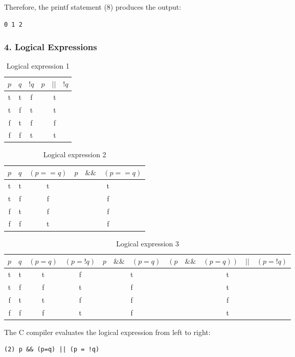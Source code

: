 \documentclass[12pt]{article}
\begin{document}
Therefore, the printf statement (8) produces the output:
\begin{lstlisting}
0 1 2
\end{lstlisting}
\newpage
\subsubsection*{4. Logical Expressions}
\begin{table}[!htb]
\centering
\begin{tabular}{|c|c|c|c|}
\hline
$p$ & $q$ & $!q$ & $ p \quad || \quad !q$ \\ \hline \hline
t & t & f & t \\ \hline
t & f & t & t \\ \hline
f & t & f & f \\ \hline
f & f & t & t \\ \hline
\end{tabular}
\caption{Logical expression 1}
\end{table}

\begin{table}[!htb]
\centering
\begin{tabular}{|c|c|c|c|}
\hline
$p$ & $q$ & $(p==q)$ & $ p \quad \&\& \quad (p==q)$ \\ \hline \hline
t & t & t & t \\ \hline
t & f & f & f \\ \hline
f & t & f & f \\ \hline
f & f & t & f \\ \hline
\end{tabular}
\caption{Logical expression  2}
\end{table}

\begin{table}[!htb]
\centering
\begin{tabular}{|c|c|c|c|c|c|}
\hline
$p$ & $q$ & $(p=q)$ & $(p=!q)$ & $p \quad \&\& \quad (p=q)$ & $(p \quad \&\& \quad (p=q)) \quad || \quad (p = !q)$\\ \hline \hline
t & t & t & f & t & t\\ \hline
t & f & f & t & f & t \\ \hline
f & t & t & f & f & f \\ \hline
f & f & f & t & f & t\\ \hline
\end{tabular}
\caption{Logical expression  3}
\end{table}
\newpage
The C compiler evaluates the logical expression from left to right:
\begin{lstlisting}
(2) p && (p=q) || (p = !q)
\end{lstlisting}
\end{document}
